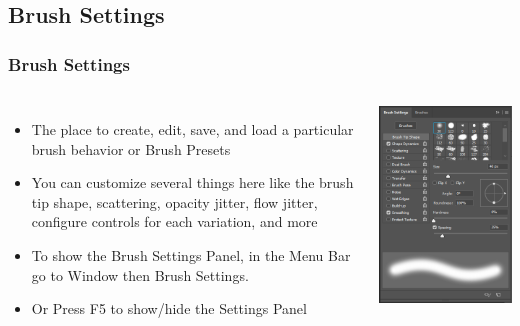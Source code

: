 \documentclass{beamer}
\begin{document}
\subsection{Brush Settings}	
\begin{frame}
	\frametitle{Brush Settings}
		\begin{columns}
		\vspace{-15pt}
		\begin{itemize}
			\item The place to create, edit, save, and load a particular brush behavior or Brush Presets
			\item You can customize several things here like the brush tip shape, scattering, opacity jitter, flow jitter, configure controls for each variation, and more
			\item To show the Brush Settings Panel, in the Menu Bar go to Window then Brush Settings.
			\item Or Press F5 to show/hide the Settings Panel
		\end{itemize}
		\includegraphics[width = 1.0\textwidth]{images/brush settings.png}
	\end{columns}
\end{frame}
	
\end{document}
